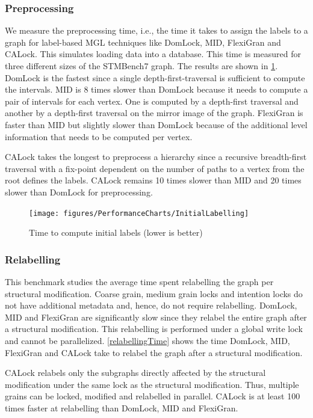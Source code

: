 \subsubsection{Preprocessing}
We measure the preprocessing time, i.e., the time it takes to assign the labels to a graph for label-based MGL techniques like DomLock, MID, FlexiGran and CALock.
This simulates loading data into a database.
This time is measured for three different sizes of the STMBench7 graph. 
The results are shown in \cref{initialLabelling}. 
DomLock is the fastest since a single depth-first-traversal is sufficient to compute the intervals. MID is 8 times slower than DomLock because it needs to compute a pair of intervals for each vertex. One is computed by a depth-first traversal and another by a depth-first traversal on the mirror image of the graph. FlexiGran is faster than MID but slightly slower than DomLock because of the additional level information that needs to be computed per vertex. 

CALock takes the longest to preprocess a hierarchy since a recursive breadth-first traversal with a fix-point dependent on the number of paths to a vertex from the root defines the labels. CALock remains 10 times slower than MID and 20 times slower than DomLock for preprocessing. 

\begin{figure}
	\centering
	\captionsetup{justification=centering}
	\texttt{[image: figures/PerformanceCharts/InitialLabelling]}
	\caption{Time to compute initial labels (lower is better)}
	\label{initialLabelling}
\end{figure}


\subsubsection{Relabelling}
This benchmark studies the average time spent relabelling the graph per structural modification. Coarse grain, medium grain locks and intention locks do not have additional metadata and, hence, do not require relabelling. 
DomLock, MID and FlexiGran are significantly slow since they relabel the entire graph after a structural modification. This relabelling is performed under a global write lock and cannot be parallelized. \cref{relabellingTime} shows the time DomLock, MID, FlexiGran and CALock take to relabel the graph after a structural modification.

CALock relabels only the subgraphs directly affected by the structural modification under the same lock as the structural modification.
Thus, multiple grains can be locked, modified and relabelled in parallel. CALock is at least 100 times faster at relabelling than DomLock, MID and FlexiGran.

